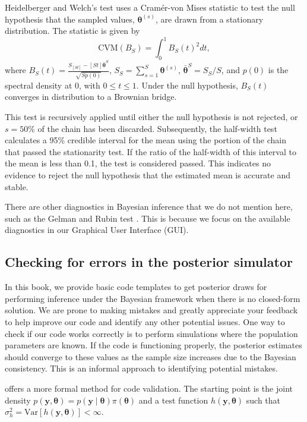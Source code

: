 Heidelberger and Welch's test \cite{Heidelberger1983} uses a Cramér-von Mises statistic to test the null hypothesis that the sampled values, $\bm{\theta}^{(s)}$, are drawn from a stationary distribution. The statistic is given by 
\[
\text{CVM}(B_S) = \int_0^1 B_S(t)^2 dt,
\]
where $B_S(t) = \frac{S_{\left[St\right]} - \left[St\right] \bar{\bm{\theta}}^S}{\sqrt{S p(0)}}$, $S_S = \sum_{s=1}^S \bm{\theta}^{(s)}$, $\bar{\bm{\theta}}^S = S_S / S$, and $p(0)$ is the spectral density at 0, with $0 \leq t \leq 1$. Under the null hypothesis, $B_S(t)$ converges in distribution to a Brownian bridge.

This test is recursively applied until either the null hypothesis is not rejected, or $s = 50\%$ of the chain has been discarded. Subsequently, the half-width test calculates a 95\% credible interval for the mean using the portion of the chain that passed the stationarity test. If the ratio of the half-width of this interval to the mean is less than 0.1, the test is considered passed. This indicates no evidence to reject the null hypothesis that the estimated mean is accurate and stable.

There are other diagnostics in Bayesian inference that we do not mention here, such as the Gelman and Rubin test \cite{Gelman1992}. This is because we focus on the available diagnostics in our Graphical User Interface (GUI).

\subsection{Checking for errors in the posterior simulator}

In this book, we provide basic code templates to get posterior draws for performing inference under the Bayesian framework when there is no closed-form solution. We are prone to making mistakes and greatly appreciate your feedback to help improve our code and identify any other potential issues. One way to check if our code works correctly is to perform simulations where the population parameters are known. If the code is functioning properly, the posterior estimates should converge to these values as the sample size increases due to the Bayesian consistency. This is an informal approach to identifying potential mistakes.

\cite{geweke2004getting} offers a more formal method for code validation. The starting point is the joint density $p(\bm{y},\bm{\theta})=p(\bm{y}\mid \bm{\theta})\pi(\bm{\theta})$ and a test function $h(\bm{y},\bm{\theta})$ such that $\sigma_h^2=\text{Var}[h(\bm{y},\bm{\theta})]<\infty$.

